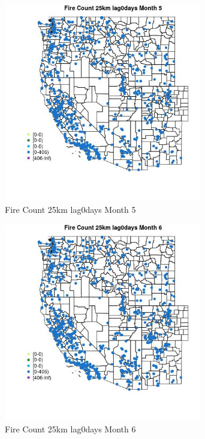 \begin{figure} 
\centering  
\includegraphics[width=0.77\textwidth]{Code_Outputs/Report_ML_input_PM25_Step4_part_f_de_duplicated_aves_prioritize_24hr_obswNAs_MapObsMo5Fire_Count_25km_lag0days.jpg} 
\caption{\label{fig:Report_ML_input_PM25_Step4_part_f_de_duplicated_aves_prioritize_24hr_obswNAsMapObsMo5Fire_Count_25km_lag0days}Fire Count 25km lag0days Month 5} 
\end{figure} 
 

\begin{figure} 
\centering  
\includegraphics[width=0.77\textwidth]{Code_Outputs/Report_ML_input_PM25_Step4_part_f_de_duplicated_aves_prioritize_24hr_obswNAs_MapObsMo6Fire_Count_25km_lag0days.jpg} 
\caption{\label{fig:Report_ML_input_PM25_Step4_part_f_de_duplicated_aves_prioritize_24hr_obswNAsMapObsMo6Fire_Count_25km_lag0days}Fire Count 25km lag0days Month 6} 
\end{figure} 
 

